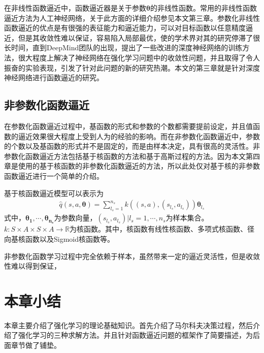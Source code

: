 在非线性函数逼近中，函数逼近器是关于参数$\mathbf{\theta}$的非线性函数。常用的非线性函数逼近方法为人工神经网络，关于此方面的详细介绍参见本文第三章。参数化非线性函数逼近的优点是有很强的表征能力和逼近能力，可以对目标函数以任意精度逼近，但是其收敛性难以保证，容易陷入局部最优，使的学术界对其的研究停滞了很长时间，直到DeepMind团队的出现，提出了一些改进的深度神经网络的训练方法，很大程度上解决了神经网络在强化学习问题中的收敛性问题，并且取得了令人振奋的实验表现，引发了针对此问题的新的研究热潮。本文的第三章就是针对深度神经网络进行函数逼近的研究。

\subsection{非参数化函数逼近}
在参数化函数逼近过程中，基函数的形式和参数的个数都需要提前设定，并且值函数的逼近效果很大程度上受到人为的经验的影响。而在非参数化函数逼近中，参数的个数以及基函数的形式并不是固定的，而是由样本决定，具有很高的灵活性。非参数化函数逼近方法包括基于核函数的方法和基于高斯过程的方法。因为本文第四章是使用的基于核函数的非参数化函数逼近的方法，所以此处仅对基于核的非参数函数逼近进行一个简单的介绍。

基于核函数逼近模型可以表示为
\begin{displaymath}
\begin{aligned}
\hat{q}(s,a,\mathbf{\theta})=\sum^{n_{s}}_{l_{s}=1}k((s,a),(s_{l_{s}},a_{l_{s}}))\mathbf{\theta}_{l_{s}}
\end{aligned}
\end{displaymath}
式中，$\mathbf{\theta_{1},\cdots,\theta_{n_{s}}}$为参数向量，${(s_{l_{s}},a_{l_{s}})|l_{s}=1,\cdots,n_{s}}$为样本集合。$k:S\times A \times S \times A \to \mathbb{R} $为核函数。其中，核函数有线性核函数、多项式核函数、径向基核函数以及Sigmoid核函数等。

非参数化函数学习过程中完全依赖于样本，虽然带来一定的逼近灵活性，但是收敛性难以得到保证，

\section{本章小结}
 本章主要介绍了强化学习的理论基础知识。首先介绍了马尔科夫决策过程，然后介绍了强化学习的三种求解方法。并且针对函数逼近问题的框架作了简要描述，为后面章节做了铺垫。